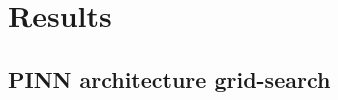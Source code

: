 \documentclass[serif,8pt, aspectratio=169]{beamer}
\begin{document}

\section{Results}
    \subsection{PINN architecture grid-search}
\end{document}
